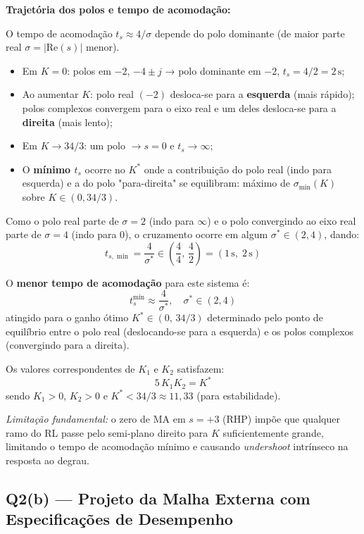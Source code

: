 \documentclass[12pt,a4paper]{article}
\begin{document}
\textbf{Trajetória dos polos e tempo de acomodação:}

O tempo de acomodação $t_s \approx 4/\sigma$ depende do polo dominante
(de maior parte real $\sigma = |\text{Re}(s)|$ menor).

\begin{itemize}
  \item Em $K = 0$: polos em $-2$, $-4 \pm j$ → polo dominante em $-2$,
        $t_s = 4/2 = 2\,\text{s}$;
  \item Ao aumentar $K$: polo real $(-2)$ desloca-se para a \textbf{esquerda}
        (mais rápido); polos complexos convergem para o eixo real e um
        deles desloca-se para a \textbf{direita} (mais lento);
  \item Em $K \to 34/3$: um polo $\to s=0$ e $t_s \to \infty$;
  \item O \textbf{mínimo $t_s$} ocorre no $K^*$ onde a contribuição do polo
        real (indo para esquerda) e a do polo "para-direita" se equilibram:
        máximo de $\sigma_{\min}(K)$ sobre $K \in (0, 34/3)$.
\end{itemize}

Como o polo real parte de $\sigma = 2$ (indo para $\infty$) e o polo
convergindo ao eixo real parte de $\sigma = 4$ (indo para $0$), o
cruzamento ocorre em algum $\sigma^* \in (2, 4)$, dando:
\[
  t_{s,\min} = \frac{4}{\sigma^*} \in \left(\frac{4}{4},\,\frac{4}{2}\right) = (1\,\text{s},\;2\,\text{s})
\]

\begin{resposta}
O \textbf{menor tempo de acomodação} para este sistema é:
\[
  t_s^{\min} \approx \frac{4}{\sigma^*}, \quad \sigma^* \in (2, 4)
\]
atingido para o ganho ótimo $K^* \in (0,\,34/3)$ determinado pelo ponto de
equilíbrio entre o polo real (deslocando-se para a esquerda) e os polos
complexos (convergindo para a direita).

Os valores correspondentes de $K_1$ e $K_2$ satisfazem:
\[
  \boxed{5\,K_1 K_2 = K^*}
\]
sendo $K_1 > 0$, $K_2 > 0$ e $K^* < 34/3 \approx 11{,}33$ (para estabilidade).

\textit{Limitação fundamental:} o zero de MA em $s = +3$ (RHP) impõe que
qualquer ramo do RL passe pelo semi-plano direito para $K$ suficientemente
grande, limitando o tempo de acomodação mínimo e causando \textit{undershoot}
intrínseco na resposta ao degrau.
\end{resposta}

\subsection*{Q2(b) — Projeto da Malha Externa com Especificações de Desempenho}
\end{document}
